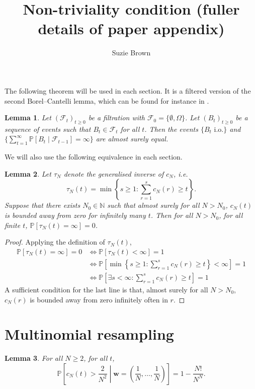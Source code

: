 \documentclass{article}
\title{Non-triviality condition (fuller details of paper appendix)}
\author{Suzie Brown}
\newtheorem{lemma}{Lemma}
\newcommand{\PR}{\mathbb{P}}
\newcommand{\1}[1]{\mathbb{I}_{#1}}
\begin{document}
\maketitle
\thispagestyle{fancy}

The following theorem will be used in each section. It is a filtered version of the second Borel--Cantelli lemma, which can be found for instance in \citet[Theorem 4.3.4]{durrett2019}.
\begin{lemma}
Let $ (\mathcal{F}_t)_{t\geq 0}$ be a filtration with $\mathcal{F}_0 = \{\emptyset, \Omega\}$. Let $(B_t)_{t\geq 0}$ be a sequence of events such that $B_t \in \mathcal{F}_t$ for all $t$.
Then the events $\{ B_t \text{ i.o.} \}$ and $\{ \sum_{t=1}^\infty \PR[B_t \mid \mathcal{F}_{t-1} ] =\infty \}$ are almost surely equal.
\end{lemma}

We will also use the following equivalence in each section.
\begin{lemma}
Let $\tau_N$ denote the generalised inverse of $c_N$, i.e.\
\begin{equation*}
\tau_N(t) = \min \left\{ s\geq 1 : \sum_{r=1}^s c_N(r) \geq t \right\} .
\end{equation*}
Suppose that there exists $N_0 \in \mathbb{N}$ such that almost surely for all $N>N_0$, $c_N(t)$ is bounded away from zero for infinitely many $t$.
Then for all $N>N_0$, for all finite $t$, $\PR[\tau_N(t) = \infty] =0$.
\end{lemma}

\begin{proof}
Applying the definition of $\tau_N(t)$,
\begin{align*}
\PR[\tau_N(t) = \infty] =0 &\Leftrightarrow \PR[\tau_N(t) < \infty] =1 \\
&\Leftrightarrow \PR\left[ \min \left\{s \geq 1 : \sum_{r=1}^s c_N(r) \geq t \right\} < \infty \right] =1 \\
&\Leftrightarrow \PR\left[ \exists s<\infty : \sum_{r=1}^s c_N(r) \geq t \right] =1
\end{align*}
A sufficient condition for the last line is that, almost surely for all $N>N_0$, $c_N(r)$ is bounded away from zero infinitely often in $r$.
\end{proof}


\section*{Multinomial resampling}

\begin{lemma}\label{lem:neutral_cN_LB}
For all $N\geq 2$, for all $t$,
\begin{equation*}
\PR \left[c_N(t) > \frac{2}{N^2} \middle| \mathbf{w}=\left( \frac{1}{N}, \dots, \frac{1}{N} \right) \right] 
= 1- \frac{N!}{N^N}.
\end{equation*}
\end{lemma}
\end{document}
